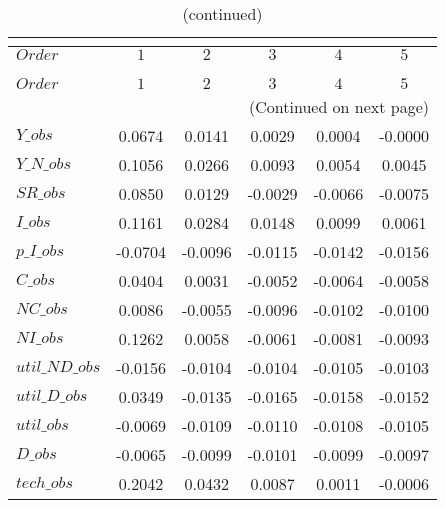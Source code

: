  
\begin{center}
\begin{longtable}{lccccc} 
\caption{COEFFICIENTS OF AUTOCORRELATION}\\
 \label{Table:th_autocorr_matrix}\\
\toprule 
$Order          $	 & 	 $          1$	 & 	 $          2$	 & 	 $          3$	 & 	 $          4$	 & 	 $          5$\\
\midrule \endfirsthead 
\caption{(continued)}\\
 \toprule \\ 
$Order          $	 & 	 $          1$	 & 	 $          2$	 & 	 $          3$	 & 	 $          4$	 & 	 $          5$\\
\midrule \endhead 
\midrule \multicolumn{6}{r}{(Continued on next page)} \\ \bottomrule \endfoot 
\bottomrule \endlastfoot 
$Y\_obs         $	 & 	     0.0674	 & 	     0.0141	 & 	     0.0029	 & 	     0.0004	 & 	    -0.0000 \\ 
$Y\_N\_obs      $	 & 	     0.1056	 & 	     0.0266	 & 	     0.0093	 & 	     0.0054	 & 	     0.0045 \\ 
$SR\_obs        $	 & 	     0.0850	 & 	     0.0129	 & 	    -0.0029	 & 	    -0.0066	 & 	    -0.0075 \\ 
$I\_obs         $	 & 	     0.1161	 & 	     0.0284	 & 	     0.0148	 & 	     0.0099	 & 	     0.0061 \\ 
$p\_I\_obs      $	 & 	    -0.0704	 & 	    -0.0096	 & 	    -0.0115	 & 	    -0.0142	 & 	    -0.0156 \\ 
$C\_obs         $	 & 	     0.0404	 & 	     0.0031	 & 	    -0.0052	 & 	    -0.0064	 & 	    -0.0058 \\ 
$NC\_obs        $	 & 	     0.0086	 & 	    -0.0055	 & 	    -0.0096	 & 	    -0.0102	 & 	    -0.0100 \\ 
$NI\_obs        $	 & 	     0.1262	 & 	     0.0058	 & 	    -0.0061	 & 	    -0.0081	 & 	    -0.0093 \\ 
$util\_ND\_obs  $	 & 	    -0.0156	 & 	    -0.0104	 & 	    -0.0104	 & 	    -0.0105	 & 	    -0.0103 \\ 
$util\_D\_obs   $	 & 	     0.0349	 & 	    -0.0135	 & 	    -0.0165	 & 	    -0.0158	 & 	    -0.0152 \\ 
$util\_obs      $	 & 	    -0.0069	 & 	    -0.0109	 & 	    -0.0110	 & 	    -0.0108	 & 	    -0.0105 \\ 
$D\_obs         $	 & 	    -0.0065	 & 	    -0.0099	 & 	    -0.0101	 & 	    -0.0099	 & 	    -0.0097 \\ 
$tech\_obs      $	 & 	     0.2042	 & 	     0.0432	 & 	     0.0087	 & 	     0.0011	 & 	    -0.0006 \\ 
\end{longtable}
 \end{center}
